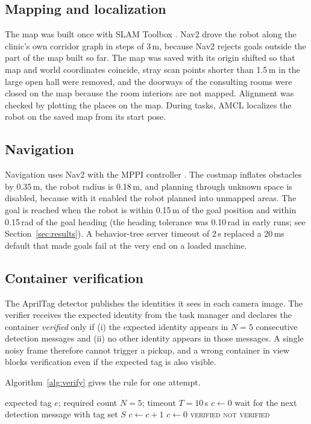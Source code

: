 \documentclass[conference]{IEEEtran}
\begin{document}
\subsection{Mapping and localization}
The map was built once with SLAM Toolbox \cite{macenski2021slamtoolbox}. Nav2 drove the robot along the clinic's own corridor graph in steps of 3\,m, because Nav2 rejects goals outside the part of the map built so far. The map was saved with its origin shifted so that map and world coordinates coincide, stray scan points shorter than 1.5\,m in the large open hall were removed, and the doorways of the consulting rooms were closed on the map because the room interiors are not mapped. Alignment was checked by plotting the places on the map. During tasks, AMCL \cite{dellaert1999mcl,fox2003kld} localizes the robot on the saved map from its start pose.

\subsection{Navigation}
Navigation uses Nav2 \cite{macenski2020marathon2} with the MPPI controller \cite{williams2017mppi}. The costmap inflates obstacles by 0.35\,m, the robot radius is 0.18\,m, and planning through unknown space is disabled, because with it enabled the robot planned into unmapped areas. The goal is reached when the robot is within 0.15\,m of the goal position and within 0.15\,rad of the goal heading (the heading tolerance was 0.10\,rad in early runs; see Section~\ref{sec:results}). A behavior-tree server timeout of 2\,s replaced a 20\,ms default that made goals fail at the very end on a loaded machine.

\subsection{Container verification}
The AprilTag detector \cite{olson2011apriltag,wang2016apriltag2} publishes the identities it sees in each camera image. The verifier receives the expected identity from the task manager and declares the container \emph{verified} only if (i) the expected identity appears in $N=5$ consecutive detection messages and (ii) no other identity appears in those messages. A single noisy frame therefore cannot trigger a pickup, and a wrong container in view blocks verification even if the expected tag is also visible.

Algorithm~\ref{alg:verify} gives the rule for one attempt.

\begin{algorithm}[t]
\caption{Container verification (one attempt)}
\label{alg:verify}
\begin{algorithmic}[1]
\REQUIRE expected tag $e$; required count $N=5$; timeout $T=10$\,s
\STATE $c \leftarrow 0$
  \STATE wait for the next detection message with tag set $S$
    \STATE $c \leftarrow c+1$
  \ELSE
    \STATE $c \leftarrow 0$
  \ENDIF
    \RETURN \textsc{verified}
  \ENDIF
\ENDWHILE
\RETURN \textsc{not verified}
\end{algorithmic}
\end{algorithm}
\end{document}
